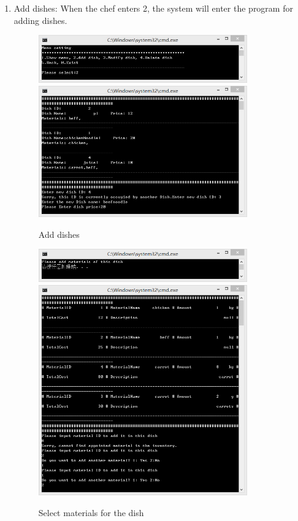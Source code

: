 \documentclass{article}
\begin{document}
\begin{enumerate}
    \item Add dishes:\newline 
    When the chef enters 2, the system will enter the program for adding dishes.
        \begin{figure}[H]
        \centering
        \includegraphics[width=0.85\textwidth]{Q/1/Q_2a.jpg}
        \includegraphics[width=0.85\textwidth]{Q/1/222221.png}
        \caption{Add dishes}
        \end{figure}
        \begin{figure}[H]
        \centering
        \includegraphics[width=0.85\textwidth]{Q/1/222222.png}
        \includegraphics[width=0.85\textwidth]{Q/1/222223.png}
        \caption{Select materials for the dish}
        \end{figure}
        

\end{enumerate}
\end{document}
